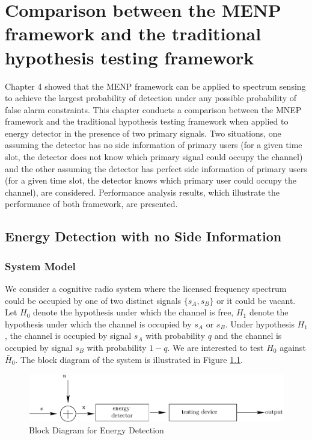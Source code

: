 \chapter{Comparison between the MENP framework and the traditional hypothesis testing framework}
Chapter 4 showed that the MENP framework can be applied to spectrum sensing to achieve the largest probability of detection under any possible probability of false alarm constraints. This chapter conducts a comparison between the MNEP framework and the traditional hypothesis testing framework when applied to energy detector in the presence of two primary signals. Two situations, one assuming the detector has no side information of primary users (for a given time slot, the detector does not know which primary signal could occupy the channel) and the other assuming the detector has perfect side information of primary users (for a given time slot, the detector knows which primary user could occupy the channel), are considered.  
Performance analysis results, which illustrate the performance of both framework, are presented.

\section{Energy Detection with no Side Information}
\subsection{System Model}
We consider a cognitive radio system where the licensed frequency spectrum could be occupied by one of two distinct signals $\{s_A, s_B\}$ or it could be vacant. 
Let $H_0$ denote the hypothesis under which the channel is free, $H_1$ denote the hypothesis under which the channel is occupied by $s_A$ or $s_B$.
Under hypothesis $H_1$, the channel is occupied by signal $s_A$ with probability $q$ and the channel is occupied by signal $s_B$ with probability $1-q$. %
We are interested to test $H_0$ against $\bar{H}_0$. The block diagram of the system is illustrated in Figure \ref{pic: ch5 diagram}.  

\begin{figure}[!hbp]
\centering
\includegraphics[width = \textwidth]{5/fig4.eps}
\caption{Block Diagram for Energy Detection}
\label{pic: ch5 diagram}
\end{figure}

